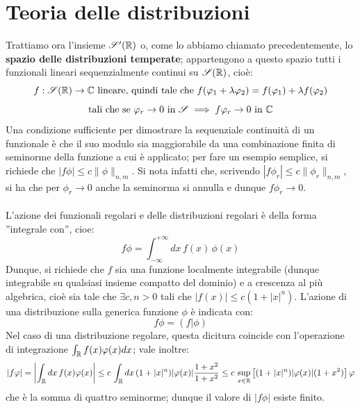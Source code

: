 \section{Teoria delle distribuzioni}
Trattiamo ora l'insieme $\mathscr{S}'(\mathbb{R})$ o, come lo abbiamo chiamato precedentemente, lo \textbf{spazio delle distribuzioni temperate}; appartengono a questo spazio tutti i funzionali lineari sequenzialmente continui su $\mathscr{S}(\mathbb{R})$, cioè:
$$f: \mathscr{S}(\mathbb{R}) \to \mathbb{C} \text{ lineare, quindi tale che } f(\varphi_1 + \lambda \varphi_2)=f(\varphi_1) + \lambda f (\varphi_2)$$
$$\text{tali che se } \varphi_r \to 0 \text{ in } \mathscr{S} \implies f \varphi_r \to 0 \text{ in }\mathbb{C}$$
Una condizione sufficiente per dimostrare la sequenziale continuità di un funzionale è che il suo modulo sia maggiorabile da una combinazione finita di seminorme della funzione a cui è applicato; per fare un esempio semplice, si richiede che $|f \phi| \leq c \|\phi\|_{n,m}$. Si nota infatti che, scrivendo $|f \phi_r| \leq c \|\phi_r\|_{n,m}$, si ha che per $\phi_r \to 0$ anche la seminorma si annulla e dunque $f \phi_r \to 0$.
\\
\\
L'azione dei funzionali regolari e delle distribuzioni regolari è della forma ''integrale con'', cioe:
$$f \phi=\int_{-\infty} ^{+\infty} dx \, f(x) \, \phi(x)$$
Dunque, si richiede che $f$ sia una funzione localmente integrabile (dunque integrabile su qualsiasi insieme compatto del dominio) e a crescenza al più algebrica, cioè sia tale che $\exists c,n>0$ tali che $|f(x)| \leq c(1+|x|^n)$. 
\clearpage
L'azione di una distribuzione sulla generica funzione $\phi$ è indicata con:
$$f \phi =(f|\phi)$$
Nel caso di una distribuzione regolare, questa dicitura coincide con l'operazione di integrazione $\int_{\mathbb{R}} f(x) \varphi(x) dx$; vale inoltre:
$$|f \varphi| = \left| \int_{\mathbb{R}} dx \, f(x) \varphi(x) \right| \leq c \, \int_{\mathbb{R}} dx \, (1+|x|^n) |\varphi(x)| \frac{1+x^2}{1+x^2} \leq c \, \sup_{x \in \mathbb{R}} \left[ (1+|x|^n) |\varphi(x)| (1+x^2) \right] \varphi$$
che è la somma di quattro seminorme; dunque il valore di $|f \phi|$ esiste finito.
